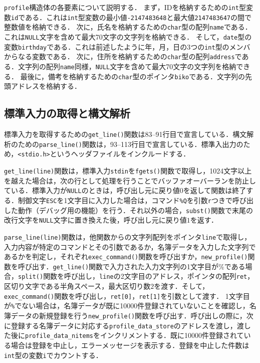 \verb|profile|構造体の各要素について説明する．
まず，IDを格納するための\verb|int|型変数\verb|id|である．これは\verb|int|型変数の最小値\verb|-2147483648|と最大値\verb|2147483647|の間で整数値を格納できる．
次に，氏名を格納するための\verb|char|型の配列\verb|name|である．これは\verb|NULL|文字を含めて最大70文字の文字列を格納できる．
そして，\verb|date|型の変数\verb|birthday|である．これは前述したように年，月，日の3つの\verb|int|型のメンバからなる変数である．
次に，住所を格納するための\verb|char|型の配列\verb|address|である．文字列の配列\verb|name|同様，\verb|NULL|文字を含めて最大70文字の文字列を格納できる．
最後に，備考を格納するための\verb|char|型のポインタ\verb|biko|である．文字列の先頭アドレスを格納する．

\subsection{標準入力の取得と構文解析}

標準入力を取得するための\verb|get_line()|関数は83--91行目で宣言している．構文解析のための\verb|parse_line()|関数は，93--113行目で宣言している．標準入出力のため，\verb|<stdio.h>|というヘッダファイルをインクルードする．

\verb|get_line(line)|関数は，標準入力\verb|stdin|を\verb|fgets()|関数で取得し，1024文字以上を越えた場合は，次の行として処理を行うことでバッファオーバーランを防止している．標準入力が\verb|NULL|のときは，呼び出し元に戻り値$0$を返して関数は終了する．制御文字\verb|ESC|を1文字目に入力した場合は，コマンド\verb|%Q|を引数\verb|r|つきで呼び出した動作（デバッグ用の機能）を行う．それ以外の場合，\verb|subst()|関数で末尾の改行文字を\verb|NULL|文字に置き換えた後，呼び出し元に戻り値$1$を返す．

\verb|parse_line(line)|関数は，他関数からの文字列配列をポインタ\verb|line|で取得し，入力内容が特定のコマンドとその引数であるか，名簿データを入力した文字列であるかを判定し，それぞれ\verb|exec_command()|関数を呼び出すか，\verb|new_profile()|関数を呼び出す．\verb|get_line()|関数で入力された入力文字列の1文字目が\%である場合，\verb|split()|関数を呼び出し，\verb|line|の2文字目のアドレス，ポインタの配列\verb|ret|，区切り文字である半角スペース，最大区切り数$2$を渡す．そして，\verb|exec_command()|関数を呼び出し，\verb|ret[0]|，\verb|ret[1]|を引数として渡す．
1文字目が\verb|%|でない場合は，名簿データが既に10000件登録されていないことを確認し，名簿データの新規登録を行う\verb|new_profile()|関数を呼び出す．呼び出しの際に，次に登録する名簿データに対応する\verb|profile_data_store|のアドレスを渡し，渡した後に\verb|profile_data_nitems|をインクリメントする．既に10000件登録されている場合は登録を中止し，エラーメッセージを表示する．登録を中止した件数は\verb|int|型の変数\verb|i|でカウントする．
